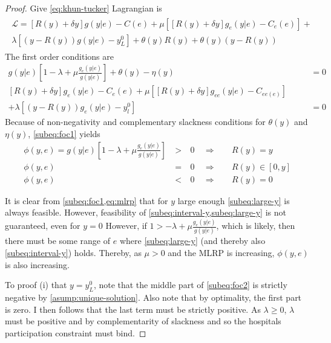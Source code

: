 \begin{proof}


Give \cref{eq:khun-tucker}  Lagrangian is
\begin{align}
    \begin{split}
        \mathcal{L}=[R(y)+\delta y]g(y|e)-C(e)+\mu [[R(y)+\delta y]g_e(y|e)-C_e(e)]+ \\ 
        \lambda [(y-R(y))g(y|e)-y_L^0]+\theta(y) R(y)+\theta(y)\left(y-R(y)\right)
    \end{split}
\end{align}
The first order conditions are
\begin{subequations}
\label{eq:foc}
\begin{align}
    g(y|e)\left[1-\lambda+\mu \frac{g_e(y|e)}{g(y|e)}\right] +\theta(y)-\eta(y) & =0 \label{subeq:foc1} \\
   [R(y)+\delta y]g_e(y|e)-C_e(e)+\mu\left[[R(y)+\delta y]g_{ee}(y|e)- C_{ee(e)}\right] \qquad & \nonumber \\ 
    +\lambda\left[(y-R(y)) g_e(y|e)-y_l^0\right] & =0 \label{subeq:foc2}
\end{align}
\end{subequations}
Because of non-negativity and complementary slackness conditions for $\theta(y)$ and $\eta(y)$, \cref{subeq:foc1} yields
\begin{subequations}
\label{eq:KT-analysis}
\begin{alignat}{3}
\phi(y,e) = g(y|e)\left[1-\lambda+\mu \frac{g_e(y|e)}{g(y|e)}\right]
   & \: > \: & 0 &\enspace \Rightarrow &&\enspace R(y)=y \label{subeq:large-y}\\
 \phi(y,e)   & \: = \: & 0 &\enspace \Rightarrow &&\enspace R(y)\in [0,y] \label{subeq:interval-y} \\
 \phi(y,e)   & \: < \: & 0 &\enspace \Rightarrow &&\enspace R(y) =0 \label{subeq:small-y}
\end{alignat}
\end{subequations}

It is clear from \cref{subeq:foc1,eq:mlrp} that for $y$ large enough \cref{subeq:large-y} is always feasible. However, feasibility of \cref{subeq:interval-y,subeq:large-y} is not guaranteed, even for $y=0$ However, if $1>-\lambda+\mu \frac{g_e(y|e)}{g(y|e)}$, which is likely, then there must be some range of $e$ where \cref{subeq:large-y} (and thereby also \cref{subeq:interval-y}) holds. Thereby, as $\mu>0$ and the MLRP is increasing, $\phi(y,e)$ is also increasing.

To proof (i) that $y=y_L^0$, note that the middle part of \cref{subeq:foc2} is strictly negative by \cref{asump:unique-solution}. Also note that by optimality, the first part is zero. I then follows that the last term must be strictly positive. As $\lambda\geq0$, $\lambda$ must be positive and by complementarity of slackness and so the hospitals participation constraint must bind. 


\end{proof}
